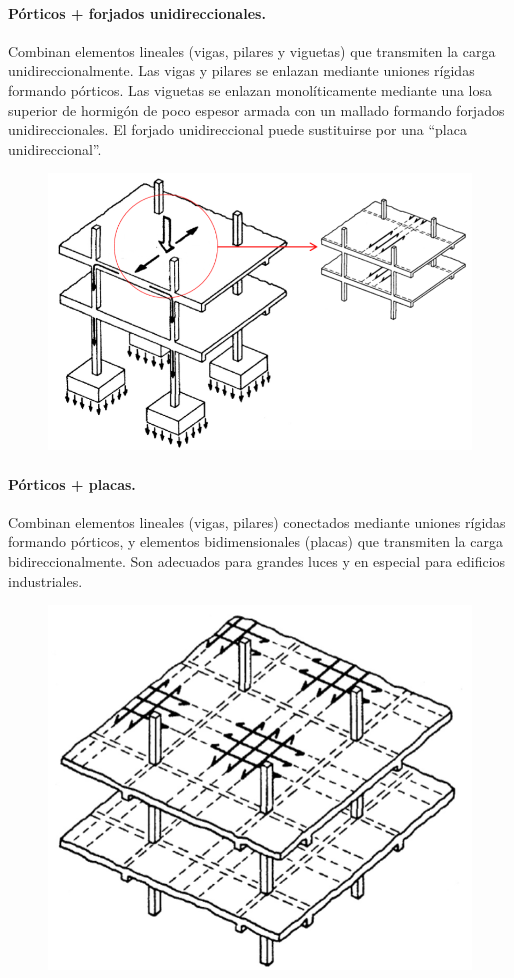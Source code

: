 \paragraph{Pórticos + forjados unidireccionales.}
Combinan elementos lineales (vigas, pilares y viguetas) que transmiten la carga unidireccionalmente. Las vigas y pilares se enlazan mediante uniones rígidas formando pórticos. Las viguetas se enlazan monolíticamente mediante una losa superior de hormigón de poco espesor armada con un mallado formando forjados unidireccionales. El forjado unidireccional puede sustituirse por una ``placa unidireccional''.

\begin{figure}[H]
    \centering
    \includegraphics[width=0.75\linewidth]{Imagenes/Porticos+forjados unidireccionales.png}
\end{figure}

\paragraph{Pórticos + placas.}
Combinan elementos lineales (vigas, pilares) conectados mediante uniones rígidas formando pórticos, y elementos bidimensionales (placas) que transmiten la carga bidireccionalmente. Son adecuados para grandes luces y en especial para edificios industriales.

\begin{figure}[H]
    \centering
    \includegraphics[width=0.75\linewidth]{Imagenes/Porticos + placas.png}
\end{figure}

